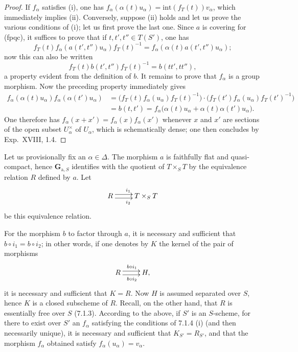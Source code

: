 \begin{proof}
If $f_\alpha$ satisfies (i), one has $f_\alpha(\alpha(t)u_\alpha)=\mathrm{int}(f_T(t))v_\alpha$, which immediately implies (ii). Conversely, suppose (ii) holds and let us prove the various conditions of (i); let us first prove the last one. Since $a$ is covering for (fpqc), it suffices to prove that if $t,t',t''\in T(S')$, one has
\[
f_T(t)f_\alpha(a(t',t'')u_\alpha)f_T(t)^{-1}=f_\alpha(\alpha(t)a(t',t'')u_\alpha);
\]
now this can also be written
\[
f_T(t)b(t',t'')f_T(t)^{-1}=b(tt',tt''),
\]
a property evident from the definition of $b$. It remains to prove that $f_\alpha$ is a group morphism. Now the preceding property immediately gives
\[
\begin{aligned}
f_\alpha(\alpha(t)u_\alpha)f_\alpha(\alpha(t')u_\alpha)
&=\bigl(f_T(t)f_\alpha(u_\alpha)f_T(t)^{-1}\bigr)\cdot\bigl(f_T(t')f_\alpha(u_\alpha)f_T(t')^{-1}\bigr)\\
&=b(t,t')=f_\alpha\bigl(\alpha(t)u_\alpha+\alpha(t)\alpha(t')u_\alpha\bigr).
\end{aligned}
\]
One therefore has $f_\alpha(x+x')=f_\alpha(x)f_\alpha(x')$ whenever $x$ and $x'$ are sections of the open subset $U_\alpha^\times$ of $U_\alpha$, which is schematically dense; one then concludes by Exp.~XVIII, 1.4.
\end{proof}
\label{XXIV.7.1.5}
Let us provisionally fix an $\alpha\in\Delta$. The morphism $a$ is faithfully flat and quasi-compact, hence $\mathbf G_{\mathrm a,S}$ identifies with the quotient of $T\times_S T$ by the equivalence relation $R$ defined by $a$. Let
\[
\xymatrix{R\ar@<.6ex>[r]^{i_1}\ar@<-.6ex>[r]_{i_2}&T\times_S T}
\]
be this equivalence relation.

For the morphism $b$ to factor through $a$, it is necessary and sufficient that $b\circ i_1=b\circ i_2$; in other words, if one denotes by $K$ the kernel of the pair of morphisms
\[
\xymatrix{R\ar@<.6ex>[r]^{b\circ i_1}\ar@<-.6ex>[r]_{b\circ i_2}&H,}
\]
it is necessary and sufficient that $K=R$. Now $H$ is assumed separated over $S$, hence $K$ is a closed subscheme of $R$. Recall, on the other hand, that $R$ is essentially free over $S$ (7.1.3).
\label{XXIV.7.1.6}
According to the above, if $S'$ is an $S$-scheme, for there to exist over $S'$ an $f_\alpha$ satisfying the conditions of 7.1.4 (i) (and then necessarily unique), it is necessary and sufficient that $K_{S'}=R_{S'}$, and that the morphism $f_\alpha$ obtained satisfy $f_\alpha(u_\alpha)=v_\alpha$.

